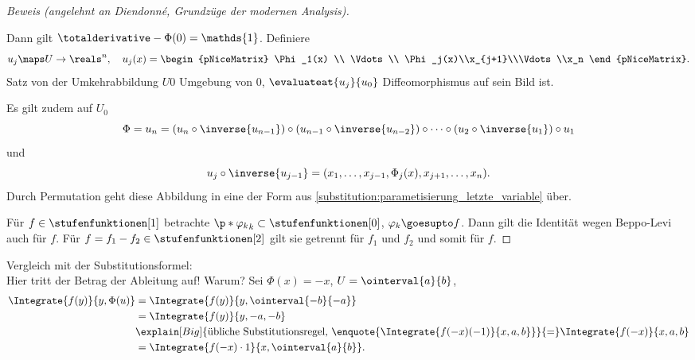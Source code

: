 \begin{proof}[Beweis (angelehnt an Diendonné, Grundzüge der modernen Analysis)]
\begin{enumerate}[label=\rechtsklammer{\arabic*.}]
    Dann gilt \( \totalderivative-{\Phi}(0)=\mathds{1} \). Definiere
    \begin{equation*}
      u_j\maps U\to \reals^n,\quad u_j(x)=\begin{pNiceMatrix} \Phi_1(x) \\ \Vdots \\ \Phi_j(x)\\x_{j+1}\\\Vdots\\x_n \end{pNiceMatrix}.
    \end{equation*}
    Satz von der Umkehrabbildung \timplies \texists \( U0 \) Umgebung von \( 0\), \sd \( \evaluateat{u_j}{u_0} \) Diffeomorphismus auf sein Bild ist.
  \end{enumerate}
  Es gilt zudem auf \( U_0 \)
  \begin{equation*}
    \Phi=u_n=(u_n\circ \inverse{u_{n-1}})\circ (u_{n-1}\circ \inverse{u_{n-2}})\circ\dotsb\circ (u_2\circ \inverse{u_1})\circ u_1
  \end{equation*}
  und
  \begin{equation*}
    u_j\circ \inverse{u_{j-1}}=(x_1,\dotsc,x_{j-1},\Phi_j(x),x_{j+1},\dotsc,x_n).
  \end{equation*}
  Durch Permutation geht diese Abbildung in eine der Form aus \ref{substitution:parametisierung_letzte_variable} über.

  Für \( f\in \stufenfunktionen[1] \) betrachte \( \p*{\varphi_k}_k\subset \stufenfunktionen[0] \), \( \varphi_k\goesupto f \). Dann gilt die Identität wegen Beppo-Levi auch für \( f \). Für \( f=f_1-f_2\in \stufenfunktionen[2] \) gilt sie getrennt für \( f_1 \) und \( f_2 \) und somit für \( f \).

  
\end{proof}
Vergleich mit der Substitutionsformel:\\
Hier tritt der Betrag der Ableitung auf! Warum? Sei \zb \( \Phi(x)=-x \), \( U=\ointerval{a}{b} \),
\begin{align*}
  \Integrate{f(y)}{y,\Phi(u)}&=\Integrate{f(y)}{y,\ointerval{-b}{-a}}\\
  &=\Integrate{f(y)}{y,-a,-b}\\
  &\explain[Big]{\text{übliche Substitutionsregel, \enquote{\( \Integrate{f(-x)(-1)}{x,a,b} \)}}}{=}\Integrate{f(-x)}{x,a,b}\\
  &=\Integrate{f(-x)\cdot 1}{x,\ointerval{a}{b}}.
\end{align*}

